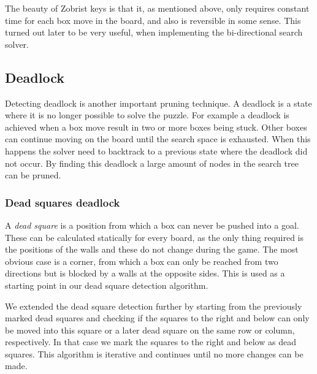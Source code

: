 \documentclass[a4paper,11pt]{article}
\renewcommand{\*}[0]{\cdot}
\begin{document}
The beauty of Zobrist keys is that it, as mentioned above, only requires
constant time for each box move in the board, and also is reversible in some
sense. This turned out later to be very useful, when implementing the
bi-directional search solver.

\subsection{Deadlock}

Detecting deadlock is another important pruning technique. A deadlock is a
state where it is no longer possible to solve the puzzle. For example a deadlock
is achieved when a box move result in two or more boxes being stuck. Other boxes
can continue moving on the board until the search space is exhausted. When this
happens the solver need to backtrack to a previous state where the deadlock did
not occur. By finding this deadlock a large amount of nodes in the search tree
can be pruned.

\subsubsection{Dead squares deadlock}

A \emph{dead square} is a position from which a box can never be pushed into a
goal. These can be calculated statically for every board, as the only thing
required is the positions of the walls and these do not change during the game.
The most obvious case is a corner, from which a box can only be reached from two
directions but is blocked by a walls at the opposite sides. This is used as a
starting point in our dead square detection algorithm.

We extended the dead square detection further by starting from the previously
marked dead squares and checking if the squares to the right and below can only
be moved into this square or a later dead square on the same row or column,
respectively. In that case we mark the squares to the right and below as dead
squares. This algorithm is iterative and continues until no more changes can
be made.
\end{document}
